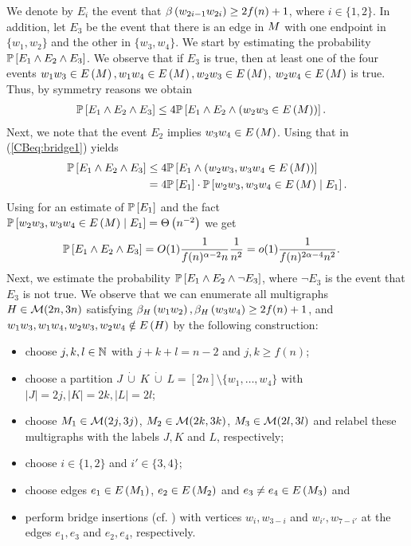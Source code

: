 We denote by $E_i$ the event that $\beta\left(w_{2i-1}w_{2i}\right)\geq 2f(n)+1$, where $i\in \{1,2\}$. In addition, let $E_3$ be the event that there is an edge in $M$ with one endpoint in $\{w_1, w_2\}$ and the other in $\{w_3, w_4\}$. We start by estimating the probability $\mathbb{P}\left[E_1\wedge E_2 \wedge E_3\right]$. We observe that if $E_3$ is true, then at least one of the four events $w_1w_3 \in E\left(M\right), w_1w_4 \in E\left(M\right), w_2w_3 \in E\left(M\right)$, $w_2w_4 \in E\left(M\right)$ is true. Thus, by symmetry reasons we obtain
\begin{align}\label{CBeq:bridge1}
\mathbb{P}\left[E_1 \wedge E_2 \wedge E_3\right]& \leq
4\mathbb{P}\left[E_1 \wedge E_2 \wedge \left(w_2w_3\in E\left(M\right)\right)\right]. 
\end{align}
Next, we note that the event $E_2$ implies $w_3w_4\in E\left(M\right)$. Using that in (\ref{CBeq:bridge1}) yields
\begin{align*}
\mathbb{P}\left[E_1 \wedge E_2 \wedge E_3\right]& \leq4\mathbb{P}\left[E_1 \wedge \left(w_2w_3, w_3w_4 \in E\left(M\right)\right)\right]
\\
&=4\mathbb{P}\left[E_1\right]\cdot \mathbb{P}\left[w_2w_3, w_3w_4 \in E\left(M\right) \;\middle|\; E_1\right].
\end{align*}
Using  for an estimate of $\mathbb{P}\left[E_1\right]$ and the fact $\mathbb{P}\left[w_2w_3, w_3w_4 \in E\left(M\right) \;\middle|\; E_1\right]=\Theta\left(n^{-2}\right)$ we get 
\begin{align*}
\mathbb{P}\left[E_1 \wedge E_2 \wedge E_3\right]&=O(1)\frac{1}{f(n)^{\alpha-2}n}\frac{1}{n^2}=o(1)\frac{1}{f(n)^{2\alpha-4}n^2}.
\end{align*}
Next, we estimate the probability $\mathbb{P}\left[E_1 \wedge E_2 \wedge \neg E_3\right]$, where $\neg E_3$ is the event that $E_3$ is not true. We observe that we can enumerate all multigraphs $H \in \mathcal{M}(2n,3n)$ satisfying $\beta_{H}\left(w_1w_2\right), \beta_{H}\left(w_3w_4\right)\geq 2f(n)+1$, and $w_1w_3, w_1w_4, w_2w_3, w_2w_4 \notin E\left(H\right)$ by the following construction:
\begin{itemize}
	\item 
	choose $j, k, l \in \mathbb{N}$ with $j+k+l=n-2$ and $j,k\geq f(n)$;
	\item
	choose a partition $J~\dot\cup~K~\dot\cup~L=[2n]\setminus\{w_1, \ldots, w_4\}$ with $|J|=2j, |K|=2k, |L|=2l$;
	\item
	choose $M_1 \in \mathcal{M}(2j,3j)$, $M_2 \in \mathcal{M}(2k,3k)$, $M_3 \in \mathcal{M}(2l,3l)$ and relabel these multigraphs with the labels $J, K$ and $L$, respectively;
	\item
	choose $i\in \{1,2\}$ and $i'\in\{3,4\}$;
	\item
	choose edges $e_1 \in E\left(M_1\right)$, $e_2 \in E\left(M_2\right)$ and $e_3\neq e_4 \in E\left(M_3\right)$ and 
	\item[]
	perform bridge insertions (cf. ) with vertices $w_i, w_{3-i}$ and $w_{i'}, w_{7-i'}$ at the edges $e_1, e_3$ and $e_2, e_4$, respectively.
\end{itemize}
